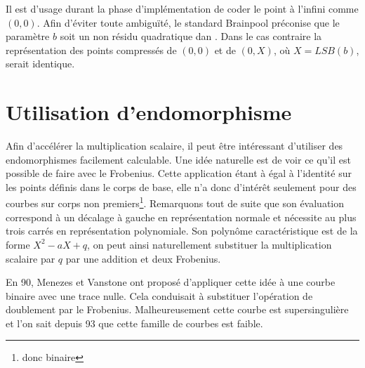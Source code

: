 \documentclass[a4paper]{report}
\begin{document}
Il est d'usage durant la phase d'implémentation de coder le point à l'infini comme $(0, 0)$. Afin d'éviter toute ambiguïté, le standard Brainpool préconise que le paramètre $b$ soit un non résidu quadratique dan . Dans le cas contraire la représentation des points compressés de $(0, 0)$ et de $(0, X)$, où $X = LSB(b)$, serait identique.

\section{Utilisation d'endomorphisme}
Afin d'accélérer la multiplication scalaire, il peut être intéressant d'utiliser des endomorphismes facilement calculable. Une idée naturelle est de voir ce qu'il est possible de faire avec le Frobenius. Cette application étant à égal à l'identité sur les points définis dans le corps de base, elle n'a donc d'intérêt seulement pour des courbes sur corps non premiers\footnote{donc binaire}. Remarquons tout de suite que son évaluation correspond à un décalage à gauche en représentation normale et nécessite au plus trois carrés en représentation polynomiale. Son polynôme caractéristique est de la forme $X^2 - aX + q$, on peut ainsi naturellement substituer la multiplication scalaire par $q$ par une addition et deux Frobenius. 

En 90, Menezes et Vanstone ont proposé d'appliquer cette idée à une courbe binaire avec une trace nulle. Cela conduisait à substituer l'opération de doublement par le Frobenius. Malheureusement cette courbe est supersingulière et l'on sait depuis 93 que cette famille de courbes est faible.
\end{document}
